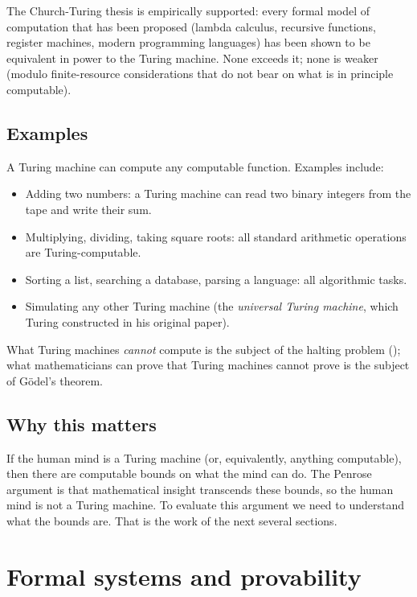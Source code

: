 The Church-Turing thesis is empirically supported: every formal
model of computation that has been proposed (lambda calculus,
recursive functions, register machines, modern programming languages)
has been shown to be equivalent in power to the Turing machine. None
exceeds it; none is weaker (modulo finite-resource considerations
that do not bear on what is in principle computable).

\subsection{Examples}

A Turing machine can compute any computable function. Examples
include:

\begin{itemize}[leftmargin=2em]
    \item Adding two numbers: a Turing machine can read two binary
    integers from the tape and write their sum.
    \item Multiplying, dividing, taking square roots: all standard
    arithmetic operations are Turing-computable.
    \item Sorting a list, searching a database, parsing a language:
    all algorithmic tasks.
    \item Simulating any other Turing machine (the
    \emph{universal Turing machine}, which Turing constructed in his
    original paper).
\end{itemize}

What Turing machines \emph{cannot} compute is the subject of the
halting problem (); what mathematicians can
prove that Turing machines cannot prove is the subject of G\"odel's
theorem.

\subsection{Why this matters}

If the human mind is a Turing machine (or, equivalently, anything
computable), then there are computable bounds on what the mind can
do. The Penrose argument is that mathematical insight transcends
these bounds, so the human mind is not a Turing machine. To evaluate
this argument we need to understand what the bounds are. That is the
work of the next several sections.

\section{Formal systems and provability}
\label{sec:formal-systems}


